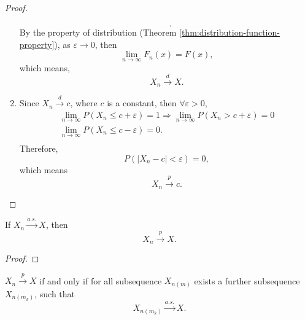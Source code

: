\begin{proof}
\begin{enumerate}
\begin{equation*}
\begin{gathered}
                  \end{gathered}.
              \end{equation*}
              By the property of distribution (Theorem \ref{thm:distribution-function-property}), as $\varepsilon\rightarrow 0$, then
              \begin{equation*}
                  \lim_{n\rightarrow\infty}F_n(x)=F(x),
              \end{equation*}
              which means,
              \begin{equation*}
                  X_n\stackrel{d}{\rightarrow}X.
              \end{equation*}
        \item
              Since $X_{n}\stackrel{d}{\rightarrow}c$, where $c$ is a constant, then $\forall\varepsilon>0$,
              \begin{equation*}
                  \begin{gathered}
                      \lim_{n\rightarrow\infty}P(X_n\leq c+\varepsilon)=1\Rightarrow\lim_{n\rightarrow\infty}P(X_n>c+\varepsilon)=0\\
                      \lim_{n\rightarrow\infty}P(X_n\leq c-\varepsilon)=0.\\
                  \end{gathered}
              \end{equation*}
              Therefore,
              \begin{equation*}
                  P\left(\left|X_n-c\right|<\varepsilon\right)=0,
              \end{equation*}
              which means
              \begin{equation*}
                  X_n\stackrel{p}{\rightarrow}c.
              \end{equation*}
    \end{enumerate}
\end{proof}

\begin{theorem}
    If $X_{n}\stackrel{a.s.}{\rightarrow}X$, then
    \begin{equation}
        X_{n}\stackrel{p}{\rightarrow}X.
    \end{equation}
\end{theorem}

\begin{proof}

\end{proof}

\begin{theorem}
    $X_n\stackrel{p}{\rightarrow}X$ if and only if for all subsequence $X_{n(m)}$ exists a further subsequence $X_{n(m_k)}$, such that
    \begin{equation}
        X_{n(m_k)}\stackrel{a.s.}{\rightarrow}X.
    \end{equation}
\end{theorem}


